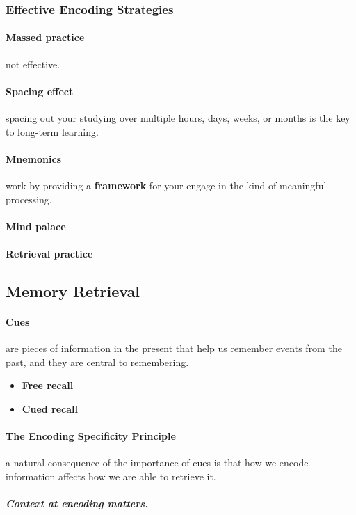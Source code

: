 \documentclass{article}
\begin{document}
	\subsubsection{Effective Encoding Strategies}
	\paragraph{Massed practice} not effective.
	\paragraph{Spacing effect} spacing out your studying over multiple hours, days, weeks, or months is the key to long-term learning.
	\paragraph{Mnemonics} work by providing a \textbf{framework} for your engage in the kind of meaningful processing.
	\paragraph{Mind palace}
	\paragraph{Retrieval practice}
	\subsection{Memory Retrieval}
	\paragraph{Cues} are pieces of information in the present that help us remember events from the past, and they are central to remembering.
	\begin{itemize}
		\item \textbf{Free recall}
		\item \textbf{Cued recall}
	\end{itemize}
	\paragraph{The Encoding Specificity Principle} a natural consequence of the importance of cues is that how we encode information affects how we are able to retrieve it.
	\paragraph{}\emph{\textbf{Context at encoding matters.}}
\end{document}
